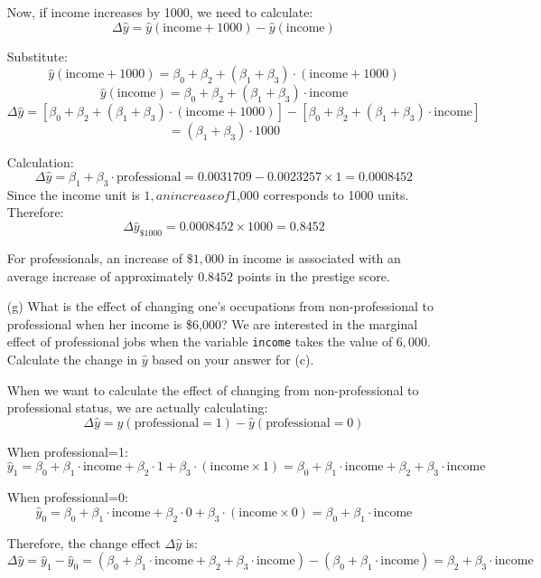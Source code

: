 \documentclass[12pt,letterpaper]{article}
\begin{document}
\begin{enumerate}
	Now, if income increases by 1000, we need to calculate:
	$$
	\Delta\hat{y} = \hat{y}(\text{income} + 1000) - \hat{y}(\text{income})
	$$
	
	Substitute:
	$$
	\hat{y}(\text{income} + 1000) = \beta_0 + \beta_2 + (\beta_1 + \beta_3) \cdot (\text{income} + 1000)
	$$
	$$
	\hat{y}(\text{income}) = \beta_0 + \beta_2 + (\beta_1 + \beta_3) \cdot \text{income}
	$$
	$$
	\Delta\hat{y} = [\beta_0 + \beta_2 + (\beta_1 + \beta_3) \cdot (\text{income} + 1000)] - [\beta_0 + \beta_2 + (\beta_1 + \beta_3) \cdot \text{income}]
	$$
	$$
	= (\beta_1 + \beta_3) \cdot 1000
	$$
	
	Calculation:\\
	$$
	\Delta\hat{y} = \beta_1 + \beta_3 \cdot \text{professional} = 0.0031709 - 
	0.0023257 \times 1 = 0.0008452
	$$
	Since the income unit is $1, an increase of $1,000 corresponds to 1000 units. Therefore:\\
	$$
	\Delta\hat{y}_{\$1000} = 0.0008452 \times 1000 = 0.8452
	$$
	
	\vspace{.5cm}
	For professionals, an increase of $\$1,000$ in income is associated with an average increase of approximately $0.8452$ points in the prestige score.
    \vspace{.5cm}

	\item [(g)]
	What is the effect of changing one's occupations from non-professional to professional when her income is \$6,000? We are interested in the marginal effect of professional jobs when the variable \texttt{income} takes the value of $6,000$. Calculate the change in $\hat{y}$ based on your answer for (c).
	
	\vspace{.5cm}
	When we want to calculate the effect of changing from non-professional to professional status, we are actually calculating:
	$$\Delta\hat{y} = \hat{y}(\text{professional}=1) - \hat{y}(\text{professional}=0)$$
	
	When professional=1:
	$$\hat{y}_1 = \beta_0 + \beta_1 \cdot \text{income} + \beta_2 \cdot 1 + \beta_3 \cdot (\text{income} \times 1) = \beta_0 + \beta_1 \cdot \text{income} + \beta_2 + \beta_3 \cdot \text{income}$$
	
	When professional=0:
	$$\hat{y}_0 = \beta_0 + \beta_1 \cdot \text{income} + \beta_2 \cdot 0 + \beta_3 \cdot (\text{income} \times 0) = \beta_0 + \beta_1 \cdot \text{income}$$
	
	Therefore, the change effect $\Delta\hat{y}$ is:
	$$\Delta\hat{y} = \hat{y}_1 - \hat{y}_0 = (\beta_0 + \beta_1 \cdot \text{income} + \beta_2 + \beta_3 \cdot \text{income}) - (\beta_0 + \beta_1 \cdot \text{income}) = \beta_2 + \beta_3 \cdot \text{income}$$
	

\end{enumerate}
\end{document}
